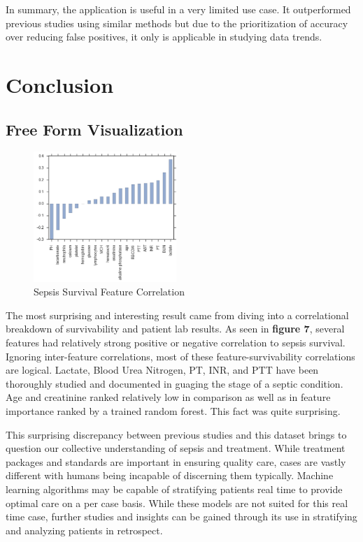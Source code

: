 \documentclass[11pt]{article}
\begin{document}
	In summary, the application is useful in a very limited use case. It outperformed previous 	studies using similar methods but due to the prioritization of accuracy over reducing false positives, it only is applicable in studying data trends.
	
	\section{Conclusion}
	
	\subsection{Free Form Visualization}
	
		\begin{figure}
		\begin{center}
			\includegraphics[width=0.48\textwidth]{correlation.png}
		\end{center}
		\caption{Sepsis Survival Feature Correlation}
	\end{figure}
	The most surprising and interesting result came from diving into a correlational breakdown of survivability and patient lab results. As seen in \textbf{figure 7}, several features had relatively strong positive or negative correlation to sepsis survival. Ignoring inter-feature correlations, most of these feature-survivability correlations are logical. Lactate, Blood Urea Nitrogen, PT, INR, and PTT have been thoroughly studied and documented in guaging the stage of a septic condition. Age and creatinine ranked relatively low in comparison as well as in feature importance ranked by a trained random forest. This fact was quite surprising. 
	
	This surprising discrepancy between previous studies and this dataset brings to question our collective understanding of sepsis and treatment. While treatment packages and standards are important in ensuring quality care, cases are vastly different with humans being incapable of discerning them typically. Machine learning algorithms may be capable of stratifying patients real time to provide optimal care on a per case basis. While these models are not suited for this real time case, further studies and insights can be gained through its use in stratifying and analyzing patients in retrospect. 
		
\end{document}
